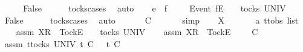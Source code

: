 \begin{isabellebody}
\ \ \isamarkupfalse%
\ \isamarkupfalse%
\ {\isachardoublequoteopen}False{\isachardoublequoteclose}\isanewline
\ \ \ \ \isamarkupfalse%
\ tocks{\isachardot}cases\ \isamarkupfalse%
\ auto\isanewline
{}\isamarkupfalse%
\isanewline
\ \ \isamarkupfalse%
\ e\ {\isasymrho}\ f\ {\isasymsigma}{\isacharprime}{\isacharprime}\isanewline
\ \ \isamarkupfalse%
\ {\isachardoublequoteopen}{\isacharbrackleft}Event\ f{\isacharbrackright}\isactrlsub E\ {\isacharhash}\ {\isasymsigma}{\isacharprime}{\isacharprime}\ {\isasymin}\ tocks\ UNIV{\isachardoublequoteclose}\isanewline
\ \ \isamarkupfalse%
\ \isamarkupfalse%
\ {\isachardoublequoteopen}False{\isachardoublequoteclose}\isanewline
\ \ \ \ \isamarkupfalse%
\ tocks{\isachardot}cases\ \isamarkupfalse%
\ auto\isanewline
\ \ \isamarkupfalse%
\ \isamarkupfalse%
\ {\isachardoublequoteopen}{\isasymrho}\ {\isasymlesssim}\isactrlsub C\ {\isasymsigma}{\isacharprime}{\isacharprime}{\isachardoublequoteclose}\isanewline
\ \ \ \ \isamarkupfalse%
\ simp\isanewline
{}\isamarkupfalse%
\isanewline
\ \ \isamarkupfalse%
\ X\ \isanewline
\ \ \isamarkupfalse%
\ {\isasymsigma}{\isacharprime}{\isacharprime}\ {\isacharcolon}{\isacharcolon}\ {\isachardoublequoteopen}{\isacharprime}a\ ttobs\ list{\isachardoublequoteclose}\isanewline
\ \ \isamarkupfalse%
\ assm{}{\isacharcolon}\ {\isachardoublequoteopen}{\isacharbrackleft}X{\isacharbrackright}\isactrlsub R\ {\isacharhash}\ {\isacharbrackleft}Tock{\isacharbrackright}\isactrlsub E\ {\isacharhash}\ {\isasymsigma}{\isacharprime}{\isacharprime}\ {\isasymin}\ tocks\ UNIV{\isachardoublequoteclose}\isanewline
\ \ \isamarkupfalse%
\ assm{}{\isacharcolon}\ {\isachardoublequoteopen}{\isacharbrackleft}X{\isacharbrackright}\isactrlsub R\ {\isacharhash}\ {\isacharbrackleft}Tock{\isacharbrackright}\isactrlsub E\ {\isacharhash}\ {\isasymsigma}{\isacharprime}{\isacharprime}\ {\isacharat}\ {\isasymsigma}{\isacharprime}\ {\isasymlesssim}\isactrlsub C\ {\isasymsigma}{\isachardoublequoteclose}\isanewline
\ \ \isamarkupfalse%
\ assm{}{\isacharcolon}\ {\isachardoublequoteopen}{\isasymforall}t{\isasymin}tocks\ UNIV{\isachardot}\ t\ {\isasymle}\isactrlsub C\ {\isasymsigma}\ {\isasymlongrightarrow}\ t\ {\isasymle}\isactrlsub C\ {\isacharbrackleft}{\isacharbrackright}{\isachardoublequoteclose}\isanewline

\end{isabellebody}
